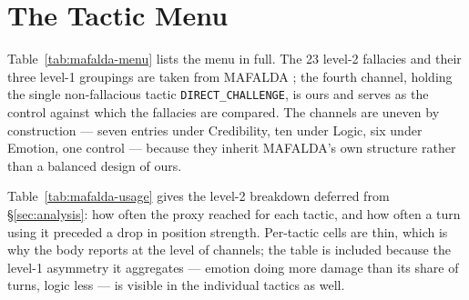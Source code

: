 \section{The Tactic Menu}
\label{app:mafalda}

Table~\ref{tab:mafalda-menu} lists the menu in full. The 23 level-2 fallacies
and their three level-1 groupings are taken from MAFALDA
\citep{helwe2024mafalda}; the fourth channel, holding the single non-fallacious
tactic \texttt{DIRECT\_CHALLENGE}, is ours and serves as the control against
which the fallacies are compared. The channels are uneven by construction ---
seven entries under Credibility, ten under Logic, six under Emotion, one
control --- because they inherit MAFALDA's own structure rather than a balanced
design of ours.

Table~\ref{tab:mafalda-usage} gives the level-2 breakdown deferred from
\S\ref{sec:analysis}: how often the proxy reached for each tactic, and how often
a turn using it preceded a drop in position strength. Per-tactic cells are thin,
which is why the body reports at the level of channels; the table is included
because the level-1 asymmetry it aggregates --- emotion doing more damage than
its share of turns, logic less --- is visible in the individual tactics as well.

